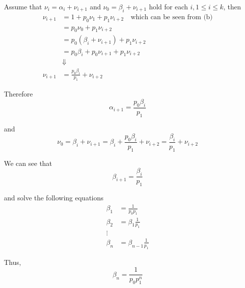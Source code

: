 \documentclass{article}
\begin{document}
\begin{enumerate}[(a)]
        Assume that $\nu_i=\alpha_i+\nu_{i+1}$ and $\nu_0=\beta_i+\nu_{i+1}$ hold for each $i,1\leq i\leq k$, then 
        \begin{equation*}
            \begin{aligned}
                \nu_{i+1}&=1+p_0\nu_1+p_1\nu_{i+2}\quad\text{which can be seen from (b)}\\
                &=p_0\nu_0+p_1\nu_{i+2}\\
                &=p_0(\beta_i+\nu_{i+1})+p_1\nu_{i+2}\\
                &=p_0\beta_i+p_0\nu_{i+1}+p_1\nu_{i+2}\\
                &\Downarrow\\
                \nu_{i+1}&=\frac{p_0\beta_i}{p_1}+\nu_{i+2}
            \end{aligned}
        \end{equation*}

        Therefore
        \begin{equation*}
            \alpha_{i+1}=\frac{p_0\beta_i}{p_1}
        \end{equation*}
        
        and
        \begin{equation*}
            \nu_0=\beta_i+\nu_{i+1}=\beta_i+\frac{p_0\beta_i}{p_1}+\nu_{i+2}=\frac{\beta_i}{p_1}+\nu_{i+2}
        \end{equation*}
        
        We can see that
        \begin{equation*}
            \beta_{i+1}=\frac{\beta_i}{p_1}
        \end{equation*}

        and solve the following equations
        \begin{equation*}
            \begin{aligned}
                \beta_1 &= \frac{1}{p_0p_1}\\
                \beta_2 &= \beta_1\frac{1}{p_1}\\
                \vdots\\
                \beta_n &= \beta_{n-1}\frac{1}{p_1}
            \end{aligned}
        \end{equation*}
        
        Thus,
        \begin{equation*}
            \beta_n = \frac{1}{p_0p_1^n}
        \end{equation*}


\end{enumerate}
\end{document}

